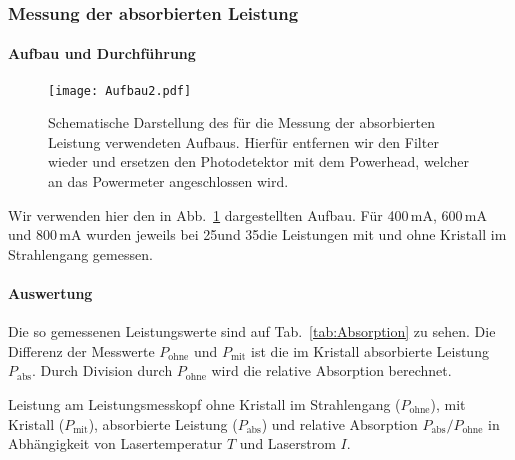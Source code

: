 \subsubsection{Messung der absorbierten Leistung}

\paragraph{Aufbau und Durchführung}

\begin{figure}[H]
\begin{center}
  \texttt{[image: Aufbau2.pdf]}
  \caption{Schematische Darstellung des für die Messung der absorbierten Leistung verwendeten
  Aufbaus. Hierfür entfernen wir den Filter wieder und ersetzen den Photodetektor mit dem
  Powerhead, welcher an das Powermeter angeschlossen wird.}
  \label{img:aufbau2}
\end{center}
\end{figure}

Wir verwenden hier den in Abb.~\ref{img:aufbau2} dargestellten Aufbau. Für 400\,mA, 600\,mA und
800\,mA wurden jeweils bei 25\grad und 35\grad die Leistungen mit und ohne Kristall im Strahlengang
gemessen.



\paragraph{Auswertung}
Die so gemessenen Leistungswerte sind auf Tab.~\ref{tab:Absorption} zu sehen.
Die Differenz der Messwerte $P_\text{ohne}$ und $P_\text{mit}$ ist die im Kristall
absorbierte Leistung $P_\text{abs}$.
Durch Division durch $P_\text{ohne}$ wird die relative Absorption berechnet.

\begin{table}[htb]
\caption{Leistung am Leistungsmesskopf ohne Kristall im Strahlengang ($P_\text{ohne}$),
mit Kristall ($P_\text{mit}$), absorbierte Leistung ($P_\text{abs}$) und relative Absorption
$P_\text{abs}/P_\text{ohne}$ in Abhängigkeit von Lasertemperatur $T$ und Laserstrom $I$.}

\label{tab:Absorption}
\end{table}
